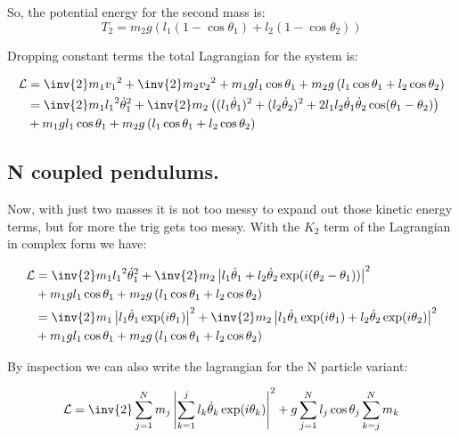 \documentclass{article}
\newcommand{\Abs}[1]{\left\lvert{#1}\right\rvert}
\newcommand{\LL}[0]{\mathcal{L}}
\newcommand{\dottheta}[0]{\dot{\theta}}
\begin{document}
So, the potential energy for the second mass is:
\begin{equation*}
T_2 = m_2 g \left( l_1 (1 - \cos\theta_1) + l_2 (1 - \cos\theta_2) \right)
\end{equation*}

Dropping constant terms the total Lagrangian for the system is:

\begin{align*}
\LL 
&= \inv{2}m_1 {v_1}^2 +\inv{2}m_2 {v_2}^2 + m_1 g l_1 \cos\theta_1 + m_2 g \left( l_1 \cos\theta_1 + l_2 \cos\theta_2 \right) \\
&=
\inv{2} m_1 {l_1}^2 {\dottheta_1}^2 
+ \inv{2} m_2 \left( (l_1 \dottheta_1)^2 + (l_2 \dottheta_2)^2 + 2 l_1 l_2 \dottheta_1 \dottheta_2 \cos(\theta_1 -\theta_2) \right) \\
&+ m_1 g l_1 \cos\theta_1 + m_2 g \left( l_1 \cos\theta_1 + l_2 \cos\theta_2 \right) \\
\end{align*}

\subsection{ N coupled pendulums. }

Now, with just two masses it is not too messy to expand out those kinetic energy terms, but for more the trig gets too messy.  With the $K_2$ term of the Lagrangian in complex form we have:

\begin{align*}
\LL 
&=
\inv{2} m_1 {l_1}^2 {\dottheta_1}^2 
+ \inv{2} m_2 \Abs{ l_1 \dottheta_1 + l_2 \dottheta_2 \exp(i(\theta_2 -\theta_1)) }^2 \\
&+ m_1 g l_1 \cos\theta_1 + m_2 g \left( l_1 \cos\theta_1 + l_2 \cos\theta_2 \right) \\
&=
\inv{2} m_1 \Abs{l_1 \dottheta_1 \exp(i\theta_1)}^2 
+ \inv{2} m_2 \Abs{ l_1 \dottheta_1 \exp(i\theta_1) + l_2 \dottheta_2 \exp(i\theta_2) }^2 \\
&+ m_1 g l_1 \cos\theta_1 + m_2 g \left( l_1 \cos\theta_1 + l_2 \cos\theta_2 \right) \\
\end{align*}

By inspection we can also write the lagrangian for the N particle variant:

\begin{equation*}
\LL 
=
\inv{2} \sum_{j=1}^N m_j \Abs{ \sum_{k=1}^j l_k \dottheta_k \exp(i\theta_k) }^2 
+ g \sum_{j=1}^N l_j \cos\theta_j \sum_{k=j}^N m_k
\end{equation*}
\end{document}
